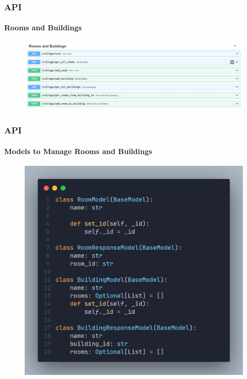 \documentclass[aspectratio=169]{beamer}
\begin{document}
\begin{frame}
	\centering
	\frametitle{API}
	\framesubtitle{Rooms and Buildings}
	\begin{minipage}{0.95\textwidth}
		\begin{figure}[H]
			\centering
			\includegraphics[width=.95\textwidth]{swagger 5.jpg}
		\end{figure}
	\end{minipage}
\end{frame}


\begin{frame}
	\centering
	\frametitle{API}
	\framesubtitle{Models to Manage Rooms and Buildings}
	\begin{minipage}{0.95\textwidth}
		\begin{figure}[H]
			\centering
			\includegraphics[width=.95\textwidth]{college.jpg}
		\end{figure}
	\end{minipage}
\end{frame}
\end{document}
